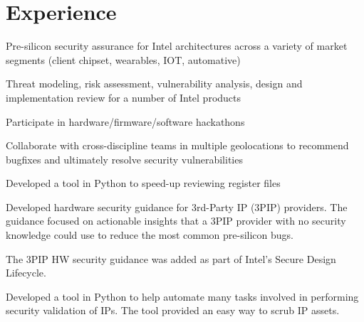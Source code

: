\documentclass[]{detrano_resume}
\begin{document}
\hfill %
%
%
\begin{minipage}[t]{0.66\textwidth} 
	
	\section{Experience}
	\vspace{\topsep} %
	\begin{tightemize}
		\item Pre-silicon security assurance for Intel architectures across a variety of market segments (client chipset, wearables, IOT, automative)
		\item Threat modeling, risk assessment, vulnerability analysis, design and implementation review for a number of Intel products 
		\item Participate in hardware/firmware/software hackathons 
		\item Collaborate with cross-discipline teams in multiple geolocations to recommend bugfixes and ultimately resolve security vulnerabilities
		\item Developed a tool in Python to speed-up reviewing register files 
	\end{tightemize}
	\sectionsep
	
	\begin{tightemize}
		\item Developed hardware security guidance for 3rd-Party IP (3PIP) providers.  The guidance focused on actionable insights that a 3PIP provider with no security knowledge could use to reduce the most common pre-silicon bugs.
		\item The 3PIP HW security guidance was added as part of Intel's Secure Design Lifecycle.
		\item Developed a tool in Python to help automate many tasks involved in performing security validation of IPs.  The tool provided an easy way to scrub IP assets.
	\end{tightemize}
	\sectionsep
	
	
	

\end{minipage}
\end{document}

